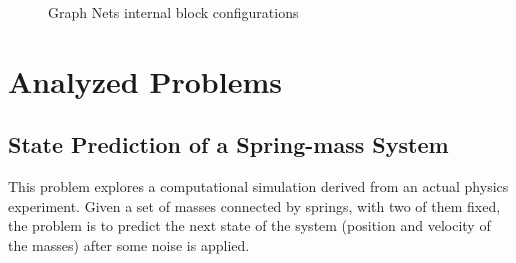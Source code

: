 \begin{figure}[H]
    \centering
    
    \caption{Graph Nets internal block configurations ~\cite{Battaglia_2018}}
    
    \label{fig:graph_nets_flexibility}
\end{figure}




\section{Analyzed Problems}


\subsection{State Prediction of a Spring-mass System}

This problem explores a computational simulation derived from an actual physics experiment. Given a set of masses connected by springs, with two of them fixed, the problem is to predict the next state of the system (position and velocity of the masses) after some noise is applied.

